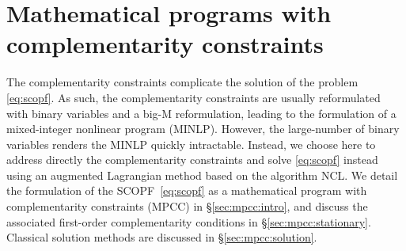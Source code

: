 \documentclass{IEEEtran4PSCC}
\newcommand{\add}[1]{#1}
\begin{document}
\section{Mathematical programs with complementarity constraints}
\add{The complementarity constraints complicate the solution of the problem \eqref{eq:scopf}.
As such, the complementarity constraints are usually reformulated with binary variables and a big-M reformulation,
leading to the formulation of a mixed-integer nonlinear program (MINLP). However,
the large-number of binary variables renders the MINLP quickly intractable.
Instead, we choose here to address directly the complementarity constraints
and solve \eqref{eq:scopf} instead using an augmented Lagrangian method based on the algorithm NCL.}
We detail the formulation of the SCOPF~\eqref{eq:scopf} as a mathematical
program with complementarity constraints (MPCC) in \S\ref{sec:mpcc:intro},
and discuss the associated first-order complementarity conditions in \S\ref{sec:mpcc:stationary}.
Classical solution methods are discussed in \S\ref{sec:mpcc:solution}.
\end{document}
